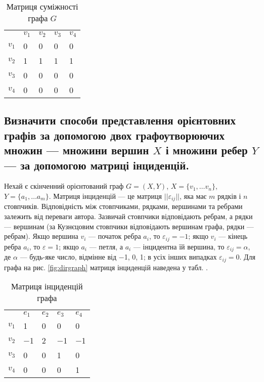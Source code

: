 \documentclass[a4paper,oneside,DIV=9,fontsize=12pt]{scrartcl}
\begin{document}
			\begin{table}[h!]
				\centering
				
				\begin{tabular}{lllll}
					\toprule
						      & $v_1$ & $v_2$ & $v_3$ & $v_4$ \\
						$v_1$ & 0     & 0     & 0     & 0     \\
						$v_2$ & 1     & 1     & 1     & 1     \\
						$v_3$ & 0     & 0     & 0     & 0     \\
						$v_4$ & 0     & 0     & 0     & 0     \\
					\bottomrule
				\end{tabular}
				
				\caption{Матриця суміжності графа $G$}
				\label{tab:dirgadjmatrix}
			\end{table}
		
		\subsection{Визначити способи представлення орієнтовних графів за допомогою двох графоутворюючих множин --- множини вершин $X$ і множини ребер $Y$ --- за допомогою матриці інциденцій.}
			Нехай є скінченний орієнтований граф $G = (X, Y)$, $X = \{v_1, \dots v_n\}$, $Y = \{a_1, \dots a_m\}$. Матриця інциденцій --- це матриця $||\varepsilon_{ij}||$, яка має $m$ рядків і $n$ стовпчиків. Відповідність між стовпчиками, рядками, вершинами та ребрами залежить від переваги автора. Зазвичай стовпчики відповідають ребрам, а рядки --- вершинам (за Кузнєцовим стовпчики відповідають вершинам графа, рядки --- ребрам). Якщо вершина $v_i$ --- початок ребра $a_i$, то $\varepsilon_{ij} = -1$; якщо $v_i$ --- кінець ребра $a_i$, то $\varepsilon = 1$; якщо $a_i$ --- петля, а $a_i$ --- інцидентна їй вершина, то $\varepsilon_{ij} = \alpha$, де $\alpha$ --- будь-яке число, відмінне від −1, 0, 1; в усіх інших випадках $\varepsilon_{ij} = 0$.
			Для графа на рис. \ref{fig:dirgraph} матриця інциденцій наведена у табл. .
			
			\begin{table}[h!]
				\centering
				
				\begin{tabular}{lllll}
					\toprule
						      & $e_1$ & $e_2$ & $e_3$ & $e_4$ \\
						$v_1$ & 1     & 0     & 0     & 0     \\
						$v_2$ & −1    & 2     & −1    & −1    \\
						$v_3$ & 0     & 0     & 1     & 0     \\
						$v_4$ & 0     & 0     & 0     & 1     \\
					\bottomrule
				\end{tabular}
				
				\caption{Матриця інциденцій графа}
			\end{table}
		
\end{document}

